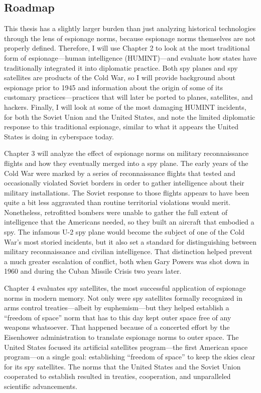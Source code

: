 \documentclass{memoir}
\begin{document}
\begin{refsegment}
\subsection{Roadmap}
This thesis has a slightly larger burden than just analyzing historical technologies through the lens of espionage norms, because espionage norms themselves are not properly defined. Therefore, I will use Chapter 2 to look at the most traditional form of espionage---human intelligence (HUMINT)---and evaluate how states have traditionally integrated it into diplomatic practice. Both spy planes and spy satellites are products of the Cold War, so I will provide background about espionage prior to 1945 and information about the origin of some of its customary practices---practices that will later be ported to planes, satellites, and hackers. Finally, I will look at some of the most damaging HUMINT incidents, for both the Soviet Union and the United States, and note the limited diplomatic response to this traditional espionage, similar to what it appears the United States is doing in cyberspace today.

Chapter 3 will analyze the effect of espionage norms on military reconnaissance flights and how they eventually merged into a spy plane. The early years of the Cold War were marked by a series of reconnaissance flights that tested and occasionally violated Soviet borders in order to gather intelligence about their military installations. The Soviet response to those flights appears to have been quite a bit less aggravated than routine territorial violations would merit. Nonetheless, retrofitted bombers were unable to gather the full extent of intelligence that the Americans needed, so they built an aircraft that embodied a spy. The infamous U-2 spy plane would become the subject of one of the Cold War's most storied incidents, but it also set a standard for distinguishing between military reconnaissance and civilian intelligence. That distinction helped prevent a much greater escalation of conflict, both when Gary Powers was shot down in 1960 and during the Cuban Missile Crisis two years later.

Chapter 4 evaluates spy satellites, the most successful application of espionage norms in modern memory. Not only were spy satellites formally recognized in arms control treaties---albeit by euphemism---but they helped establish a ``freedom of space'' norm that has to this day kept outer space free of any weapons whatsoever. That happened because of a concerted effort by the Eisenhower administration to translate espionage norms to outer space. The United States focused its artificial satellites program---the first American space program---on a single goal: establishing ``freedom of space'' to keep the skies clear for its spy satellites. The norms that the United States and the Soviet Union cooperated to establish resulted in treaties, cooperation, and unparalleled scientific advancements.


\end{refsegment}
\end{document}
